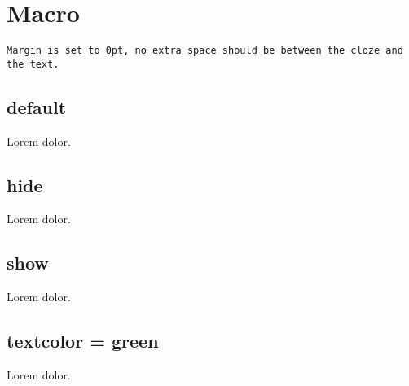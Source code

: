 \documentclass{article}
\begin{document}
\section{Macro \texttt{\string\clozenol}}

\texttt{Margin is set to 0pt, no extra space should be between the cloze
and the text.}

\subsection{default}

Lorem  dolor.

\subsection{hide}

\clozehide

Lorem  dolor.

\subsection{show}

\clozeshow

Lorem  dolor.

\subsection{textcolor = green}


Lorem  dolor.
\end{document}
